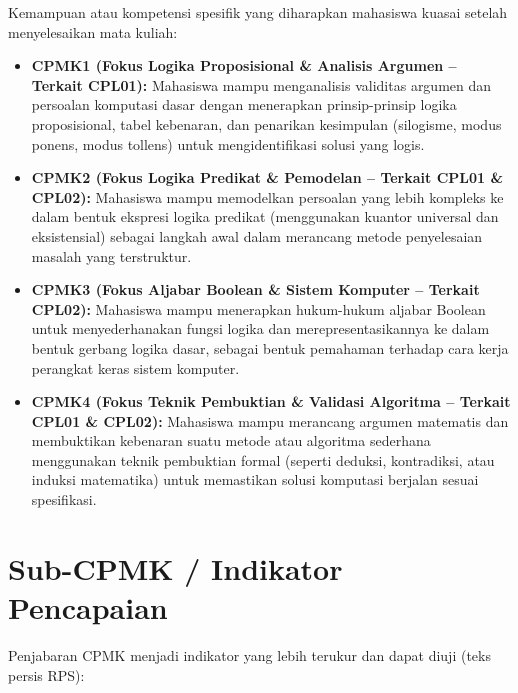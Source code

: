 \documentclass[../main]{subfiles}
\begin{document}
Kemampuan atau kompetensi spesifik yang diharapkan mahasiswa kuasai setelah menyelesaikan mata kuliah:

\begin{itemize}[leftmargin=*]
  \item \textbf{CPMK1 (Fokus Logika Proposisional \& Analisis Argumen -- Terkait CPL01):} Mahasiswa mampu menganalisis validitas argumen dan persoalan komputasi dasar dengan menerapkan prinsip-prinsip logika proposisional, tabel kebenaran, dan penarikan kesimpulan (silogisme, modus ponens, modus tollens) untuk mengidentifikasi solusi yang logis.
  \item \textbf{CPMK2 (Fokus Logika Predikat \& Pemodelan -- Terkait CPL01 \& CPL02):} Mahasiswa mampu memodelkan persoalan yang lebih kompleks ke dalam bentuk ekspresi logika predikat (menggunakan kuantor universal dan eksistensial) sebagai langkah awal dalam merancang metode penyelesaian masalah yang terstruktur.
  \item \textbf{CPMK3 (Fokus Aljabar Boolean \& Sistem Komputer -- Terkait CPL02):} Mahasiswa mampu menerapkan hukum-hukum aljabar Boolean untuk menyederhanakan fungsi logika dan merepresentasikannya ke dalam bentuk gerbang logika dasar, sebagai bentuk pemahaman terhadap cara kerja perangkat keras sistem komputer.
  \item \textbf{CPMK4 (Fokus Teknik Pembuktian \& Validasi Algoritma -- Terkait CPL01 \& CPL02):} Mahasiswa mampu merancang argumen matematis dan membuktikan kebenaran suatu metode atau algoritma sederhana menggunakan teknik pembuktian formal (seperti deduksi, kontradiksi, atau induksi matematika) untuk memastikan solusi komputasi berjalan sesuai spesifikasi.
\end{itemize}

\section*{Sub-CPMK / Indikator Pencapaian}

Penjabaran CPMK menjadi indikator yang lebih terukur dan dapat diuji (teks persis RPS):
\end{document}
